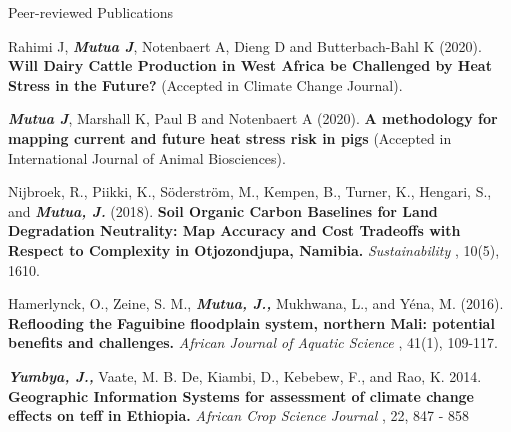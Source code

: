 \documentclass{resume} %
\begin{document}
\begin{rSection}{Peer-reviewed Publications}

Rahimi J, {\bf \em{Mutua J}}, Notenbaert A, Dieng D and Butterbach-Bahl K (2020). { \bf Will Dairy Cattle Production in West Africa be Challenged by Heat Stress in the Future? } (Accepted in Climate Change Journal).

{\bf \em{Mutua J}}, Marshall K, Paul B and Notenbaert A (2020). { \bf A methodology for mapping current and future heat stress risk in pigs } (Accepted in International Journal of Animal Biosciences).

Nijbroek, R., Piikki, K., S\"oderstr\"om, M., Kempen, B., Turner, K., Hengari, S., and {\bf \em{Mutua, J.}} (2018). { \bf Soil Organic Carbon Baselines for Land Degradation Neutrality: Map Accuracy and Cost Tradeoffs with Respect to Complexity in Otjozondjupa, Namibia. } {\em Sustainability }, 10(5), 1610.

Hamerlynck, O., Zeine, S. M., {\bf \em{Mutua, J.,}} Mukhwana, L., and Y\'ena, M. (2016). { \bf Reflooding the Faguibine floodplain system, northern Mali: potential benefits and challenges. } {\em African Journal of Aquatic Science }, 41(1), 109-117.

{\bf \em{Yumbya, J.,}} Vaate, M. B. De, Kiambi, D., Kebebew, F., and Rao, K. 2014. { \bf Geographic Information Systems for assessment of climate change effects on teff in Ethiopia. } {\em African Crop Science Journal }, 22, 847 - 858

\end{rSection}

\end{document}

